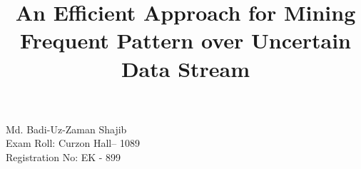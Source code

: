 \documentclass[12pt,a4paper,oneside]{csedu}  %
\begin{document}
\frontmatter      %

\title{An Efficient Approach for Mining Frequent Pattern over Uncertain Data Stream}
\authors  %
{Md. Badi-Uz-Zaman Shajib  \\Exam Roll: Curzon Hall-- 1089\\Registration No: EK - 899}



\maketitle



\fancyhead{}  %
\rhead{\thepage}  %
\lhead{}  %

\pagestyle{fancy}  %
\end{document}
